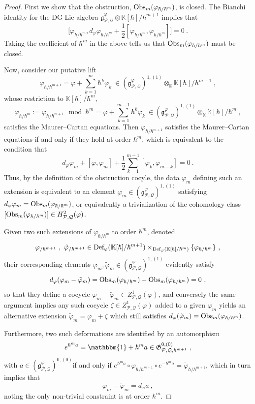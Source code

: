 \documentclass[11pt]{amsart}
\numberwithin{equation}{section}
\theoremstyle{definition}
\newcommand{\bb}{\mathbb}
\newcommand{\mc}{\mathcal}
\newcommand{\mf}{\mathfrak}
\newcommand{\Def}{{\textup{Def}}}
\newcommand{\K}{{\bb K}}
\newcommand{\ik}{{\bb K}}
\newcommand{\Obs}{{\textup{Obs}}}
\newcommand{\0}{{\textbf{0}}}
\newcommand{\id}{{\textup{id}}}
\newcommand{\g}{{\mf{g}}}
\def\PP{{\mc P}}
\def\QQ{{\mc Q}}
\def\gf{\mathfrak{g}}
\def \mf{\mathfrak}
\def \id{\mathbbm{1}}
\begin{document}
\begin{proof} 
First we show that the obstruction,	$\Obs_m(\varphi_{\hbar/\hbar^{m}})$, is closed. The Bianchi identity for the DG Lie algebra $\gf^\varphi_{\PP,\QQ}\otimes \ik[\hbar]/\hbar^{m+1}$ implies that 
\[
\big[\varphi_{\hbar/\hbar^{m}}, d_\varphi \varphi_{\hbar/\hbar^{m}} + \frac12[\varphi_{\hbar/\hbar^{m}},\varphi_{\hbar/\hbar^{m}}]\big]=0~.
\]
Taking the coefficient of $\hbar^m$ in the above tells us that $\Obs_m(\varphi_{\hbar/\hbar^m})$ must be closed.

Now, consider our putative lift
\[ 
\varphi_{\hbar / \hbar^{m+1}}= \varphi + \sum_{k=1}^m \hbar^k \varphi_k \ \in (\g_{\mc P, \mc Q}^{\varphi})^{1,(1)}\otimes_{\K} \K[\hbar]/\hbar^{m+1} ~,
\]
whose restriction to $\ik[\hbar]/\hbar^m$,
\[
\varphi_{\hbar/\hbar^m} := \varphi_{\hbar/\hbar^{m+1}} \mod \hbar^m  =\varphi+  \sum_{k=1}^{m-1} \hbar^k \varphi_k \ \in  (\g_{\mc P, \mc Q}^{\varphi})^{1,(1)}\otimes_{\K} \K[\hbar]/\hbar^{m} ~,
\] 
satisfies the Maurer--Cartan equations. Then $\varphi_{ \hbar / \hbar^{m+1}}$ satisfies the Maurer--Cartan equations if and only if they hold at order $\hbar^m$, which is equivalent to the condition that
\begin{equation}\label{defMCeqn}
	d_\varphi \varphi_m +[\varphi,\varphi_m] + \frac{1}{2} \sum_{k=1}^{m-1}[ \varphi_k,\varphi_{m-k} ] = 0 \ .
\end{equation}
Thus, by the definition of the obstruction cocyle, the data $\varphi_m$ defining such an extension is equivalent to an element $\varphi_m\in (\g_{\mc P, \mc Q}^{\varphi}) ^{1,(1)}$ satisfying $d_\varphi \varphi_m = \Obs_m(\varphi_{\hbar/\hbar^{m}})$, or equivalently a trivialization of the cohomology class $[ \Obs_m(\varphi_{\hbar/\hbar^{m}})]\in H^2_{\mc P,\mc Q}(\varphi)$.
	
Given two such extensions of $\varphi_{\hbar/\hbar^{m}}$ to order $\hbar^{m}$, denoted
\[\varphi_{ / \hbar^{m+1}} \  , \ \tilde \varphi_{ / \hbar^{m+1}} \in \Def_\varphi(\K[\hbar]/\hbar^{m+1}) \times_{\Def_\varphi(\K[\hbar]/\hbar^{m}) } \{\varphi_{\hbar/\hbar^{m}} \} \ , \]
their corresponding elements $\varphi_m, \tilde\varphi_m \in (\g_{\mc P, \mc Q}^{\varphi})^{1,(1)} $ evidently satisfy
\[ d_\varphi(\varphi_m- \tilde\varphi_m )=\Obs_m(\varphi_{\hbar/\hbar^{m}})-\Obs_m(\varphi_{\hbar/\hbar^{m}})=0~,\]
so that they define a cocycle $\varphi_m- \tilde\varphi_m \in Z^1_{\mc P,\mc Q}(\varphi)$, and conversely the same argument implies any such cocycle $\zeta \in Z^1_{\mc P,\mc Q}(\varphi)$ added to a given $\varphi_m$ yields an alternative extension $\tilde \varphi_m=\varphi_m + \zeta$ which still satisfies $d_\varphi(\tilde \varphi_m)=\Obs_m(\varphi_{\hbar/\hbar^{m}})$.

Furthermore, two such deformations are identified by an automorphism
\[
e^{\hbar^m a} = \id + \hbar^m a \in {\frak G}^{0,(0)}_{\PP,\QQ,\hbar^{m+1}} ~,
\]
with $a\in (\g_{\mc P,\mc Q}^\varphi)^{0,(0)}$if and only if $e^{\hbar^m a}\circ \varphi_{\hbar/\hbar^{m+1}}\circ e^{-\hbar^m a} = \widetilde{\varphi}_{\hbar/\hbar^{m+1}}$, which in turn implies that
\[ 
\varphi_m - \tilde\varphi_m = d_\varphi a \ ,
\]
noting the only non-trivial constraint is at order $\hbar^m$.

\end{proof}
\end{document}
